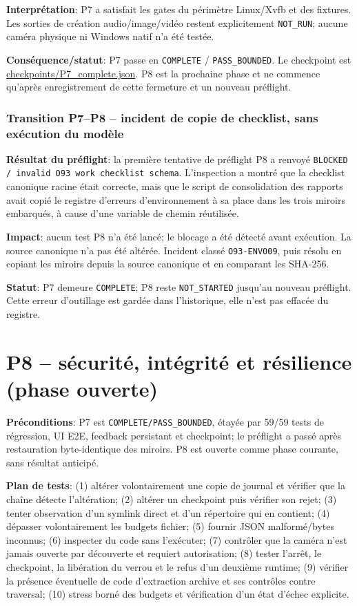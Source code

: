 \documentclass[11pt,a4paper,oneside]{report}
\begin{document}
\textbf{Interprétation}: P7 a satisfait les gates du périmètre Linux/Xvfb et des fixtures. Les sorties de création audio/image/vidéo restent explicitement \texttt{NOT\_RUN}; aucune caméra physique ni Windows natif n’a été testée.

\textbf{Conséquence/statut}: P7 passe en \texttt{COMPLETE} / \texttt{PASS\_BOUNDED}. Le checkpoint est \url{checkpoints/P7_complete.json}.
P8 est la prochaine phase et ne commence qu’après enregistrement de cette fermeture et un nouveau préflight.


\subsection{Transition P7--P8 -- incident de copie de checklist, sans exécution du modèle}
\textbf{Résultat du préflight}: la première tentative de préflight P8 a renvoyé \texttt{BLOCKED / invalid O93 work checklist schema}. L’inspection a montré que la checklist canonique racine était correcte, mais que le script de consolidation des rapports avait copié le registre d’erreurs d’environnement à sa place dans les trois miroirs embarqués, à cause d’une variable de chemin réutilisée.

\textbf{Impact}: aucun test P8 n’a été lancé; le blocage a été détecté avant exécution. La source canonique n’a pas été altérée. Incident classé \texttt{O93-ENV009}, puis résolu en copiant les miroirs depuis la source canonique et en comparant les SHA-256.

\textbf{Statut}: P7 demeure \texttt{COMPLETE}; P8 reste \texttt{NOT\_STARTED} jusqu’au nouveau préflight. Cette erreur d’outillage est gardée dans l’historique, elle n’est pas effacée du registre.


\chapter{P8 -- sécurité, intégrité et résilience (phase ouverte)}
\textbf{Préconditions}: P7 est \texttt{COMPLETE/PASS\_BOUNDED}, étayée par 59/59 tests de régression, UI E2E, feedback persistant et checkpoint; le préflight a passé après restauration byte-identique des miroirs. P8 est ouverte comme phase courante, sans résultat anticipé.

\textbf{Plan de tests}: (1) altérer volontairement une copie de journal et vérifier que la chaîne détecte l’altération; (2) altérer un checkpoint puis vérifier son rejet; (3) tenter observation d’un symlink direct et d’un répertoire qui en contient; (4) dépasser volontairement les budgets fichier; (5) fournir JSON malformé/bytes inconnus; (6) inspecter du code sans l’exécuter; (7) contrôler que la caméra n’est jamais ouverte par découverte et requiert autorisation; (8) tester l’arrêt, le checkpoint, la libération du verrou et le refus d’un deuxième runtime; (9) vérifier la présence éventuelle de code d’extraction archive et ses contrôles contre traversal; (10) stress borné des budgets et vérification d’un état d’échec explicite.
\end{document}

